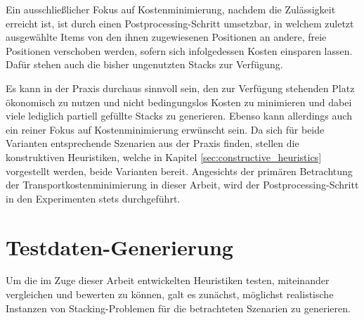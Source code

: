 Ein ausschließlicher Fokus auf Kostenminimierung, nachdem die Zulässigkeit erreicht ist, ist durch
einen Postprocessing-Schritt umsetzbar, in welchem zuletzt ausgewählte Items von den ihnen zugewiesenen Positionen
an andere, freie Positionen verschoben werden, sofern sich infolgedessen Kosten einsparen lassen.
Dafür stehen auch die bisher ungenutzten Stacks zur Verfügung.

Es kann in der Praxis durchaus sinnvoll sein, den zur Verfügung stehenden Platz ökonomisch zu nutzen
und nicht bedingungslos Kosten zu minimieren und dabei viele lediglich partiell gefüllte Stacks zu generieren.
Ebenso kann allerdings auch ein reiner Fokus auf Kostenminimierung erwünscht sein. Da sich für beide Varianten
entsprechende Szenarien aus der Praxis finden, stellen die konstruktiven Heuristiken,
welche in Kapitel \ref{sec:constructive_heuristics} vorgestellt werden, beide Varianten bereit.
Angesichts der primären Betrachtung der Transportkostenminimierung in dieser Arbeit,
wird der Postprocessing-Schritt in den Experimenten stets durchgeführt.

\vfill
\pagebreak

\section{Testdaten-Generierung}
\label{sec:test_data}

Um die im Zuge dieser Arbeit entwickelten Heuristiken testen, miteinander vergleichen
und bewerten zu können, galt es zunächst, möglichst realistische Instanzen von Stacking-Problemen
für die betrachteten Szenarien zu generieren.

